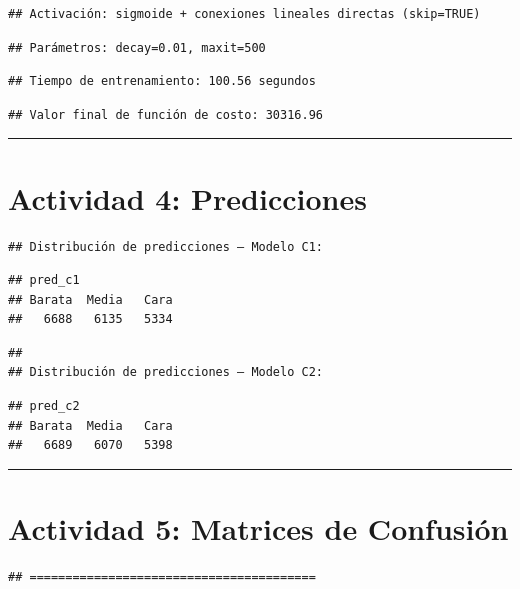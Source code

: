 \documentclass[
]{article}
\begin{document}
\begin{verbatim}
## Activación: sigmoide + conexiones lineales directas (skip=TRUE)
\end{verbatim}

\begin{verbatim}
## Parámetros: decay=0.01, maxit=500
\end{verbatim}

\begin{verbatim}
## Tiempo de entrenamiento: 100.56 segundos
\end{verbatim}

\begin{verbatim}
## Valor final de función de costo: 30316.96
\end{verbatim}

\begin{center}\rule{0.5\linewidth}{0.5pt}\end{center}

\section{Actividad 4: Predicciones}\label{actividad-4-predicciones}

\begin{verbatim}
## Distribución de predicciones – Modelo C1:
\end{verbatim}

\begin{verbatim}
## pred_c1
## Barata  Media   Cara 
##   6688   6135   5334
\end{verbatim}

\begin{verbatim}
## 
## Distribución de predicciones – Modelo C2:
\end{verbatim}

\begin{verbatim}
## pred_c2
## Barata  Media   Cara 
##   6689   6070   5398
\end{verbatim}

\begin{center}\rule{0.5\linewidth}{0.5pt}\end{center}

\section{Actividad 5: Matrices de
Confusión}\label{actividad-5-matrices-de-confusiuxf3n}

\begin{verbatim}
## ========================================
\end{verbatim}
\end{document}
